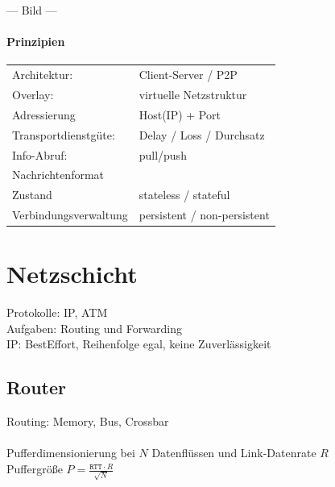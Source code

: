 \documentclass[fs, footer]{latex4ei}
\begin{document}
\begin{multicols*}{4}
--- Bild ---



\paragraph{Prinzipien} %
\label{par:prinzipien}

\begin{tabular}{ll}
	Architektur: & Client-Server / P2P\\
	Overlay: & virtuelle Netzstruktur\\
	Adressierung & Host(IP) + Port\\
	Transportdienstgüte: & Delay / Loss / Durchsatz\\
	Info-Abruf: & pull/push\\
	Nachrichtenformat & \\
	Zustand & stateless / stateful\\
	Verbindungsverwaltung & persistent / non-persistent\\
\end{tabular}




\section{Netzschicht}
Protokolle: IP, ATM\\
Aufgaben: Routing und Forwarding\\
IP: BestEffort, Reihenfolge egal,  keine Zuverlässigkeit\\

	\subsection{Router}
	Routing: Memory, Bus, Crossbar\\
	\\
	Pufferdimensionierung bei $N$ Datenflüssen und Link-Datenrate $R$\\
	Puffergröße $P = \frac{\texttt{RTT} \cdot R}{\sqrt{N}}$\\



\end{multicols*}
\end{document}

